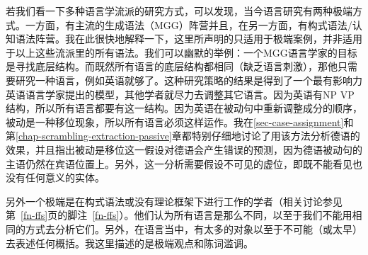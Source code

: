 若我们看一下多种语言学流派的研究方式，可以发现，当今语言研究有两种极端方式。一方面，有主流的生成语法（MGG）阵营并且，在另一方面，有构式语法/认知语法阵营。我在此很快地解释一下，这里所声明的只适用于极端案例，并非适用于以上这些流派里的所有语法。我们可以幽默的举例：一个MGG语言学家的目标是寻找底层结构。而既然所有语言的底层结构都相同（缺乏语言刺激），那他只需要研究一种语言，例如英语就够了。这种研究策略的结果是得到了一个最有影响力英语语言学家提出的模型，其他学者就尽力去调整其它语言。因为英语有NP VP结构，所以所有语言都要有这一结构。因为英语在被动句中重新调整成分的顺序，被动是一种移位现象，所以所有语言必须这样运作。我在\ref{sec-case-assignment}和第\ref{chap-scrambling-extraction-passive}章都特别仔细地讨论了用该方法分析德语的效果，并且指出被动是移位这一假设对德语会产生错误的预测，因为德语被动句的主语仍然在宾语位置上。另外，这一分析需要假设不可见的虚位，即既不能看见也没有任何意义的实体。

另外一个极端是在构式语法或没有理论框架下进行工作的学者（相关讨论参见第~\ref{fn-ffs}页的脚注~\ref{fn-ffs}）。他们认为所有语言是那么不同，以至于我们不能用相同的方式去分析它们。另外，在语言当中，有太多的对象以至于不可能（或太早）去表述任何概括。我这里描述的是极端观点和陈词滥调。

